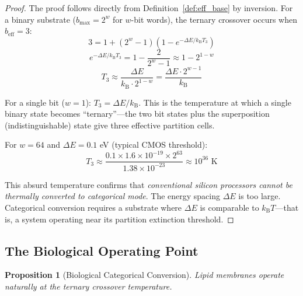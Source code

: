\documentclass[twocolumn,10pt]{article}
\newtheorem{proposition}[theorem]{Proposition}
\theoremstyle{remark}
\newcommand{\kB}{k_{\mathrm{B}}}
\begin{document}
\begin{proof}
The proof follows directly from Definition~\ref{def:eff_base} by inversion. For a binary substrate ($b_{\max} = 2^w$ for $w$-bit words), the ternary crossover occurs when $b_{\text{eff}} = 3$:
\begin{equation}
    3 = 1 + (2^w - 1)(1 - e^{-\Delta E / \kB T_3})
\end{equation}
\begin{equation}
    e^{-\Delta E / \kB T_3} = 1 - \frac{2}{2^w - 1} \approx 1 - 2^{1-w}
\end{equation}
\begin{equation}
    T_3 \approx \frac{\Delta E}{\kB \cdot 2^{1-w}} = \frac{\Delta E \cdot 2^{w-1}}{\kB}
\end{equation}

For a single bit ($w = 1$): $T_3 = \Delta E / \kB$. This is the temperature at which a single binary state becomes ``ternary''---the two bit states plus the superposition (indistinguishable) state give three effective partition cells.

For $w = 64$ and $\Delta E = 0.1$ eV (typical CMOS threshold):
\begin{equation}
    T_3 \approx \frac{0.1 \times 1.6 \times 10^{-19} \times 2^{63}}{1.38 \times 10^{-23}} \approx 10^{36} \text{ K}
\end{equation}

This absurd temperature confirms that \emph{conventional silicon processors cannot be thermally converted to categorical mode}. The energy spacing $\Delta E$ is too large. Categorical conversion requires a substrate where $\Delta E$ is comparable to $\kB T$---that is, a system operating near its partition extinction threshold.
\end{proof}

\subsection{The Biological Operating Point}

\begin{proposition}[Biological Categorical Conversion]
\label{prop:biological}
Lipid membranes operate naturally at the ternary crossover temperature.
\end{proposition}
\end{document}
